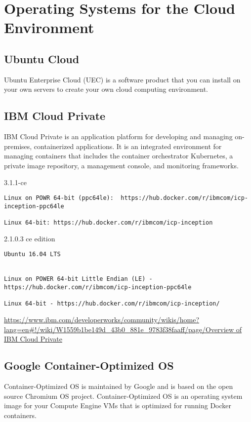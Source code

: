 \chapter{Operating Systems for the Cloud Environment}


\section{Ubuntu Cloud}

Ubuntu Enterprise Cloud (UEC) is a software product that you can install on your
own servers to create your own cloud computing environment.

\section{IBM Cloud Private}

IBM Cloud Private is an application platform for developing and managing
on-premises, containerized applications.
It is an integrated environment for managing containers that includes the
container orchestrator Kubernetes, a private image repository, a management
console, and monitoring frameworks.

3.1.1-ce 
\begin{verbatim}
Linux on POWR 64-bit (ppc64le):  https://hub.docker.com/r/ibmcom/icp-inception-ppc64le

Linux 64-bit: https://hub.docker.com/r/ibmcom/icp-inception
\end{verbatim} 

2.1.0.3 ce edition
\begin{verbatim}
Ubuntu 16.04 LTS


Linux on POWER 64-bit Little Endian (LE) - https://hub.docker.com/r/ibmcom/icp-inception-ppc64le

Linux 64-bit - https://hub.docker.com/r/ibmcom/icp-inception/   
\end{verbatim}
\url{https://www.ibm.com/developerworks/community/wikis/home?lang=en#!/wiki/W1559b1be149d_43b0_881e_9783f38faaff/page/Overview of IBM Cloud Private}

\section{Google Container-Optimized OS}

Container-Optimized OS is maintained by Google and is based on the open source
Chromium OS project. Container-Optimized OS is an operating system image for
your Compute Engine VMs that is optimized for running Docker containers.


